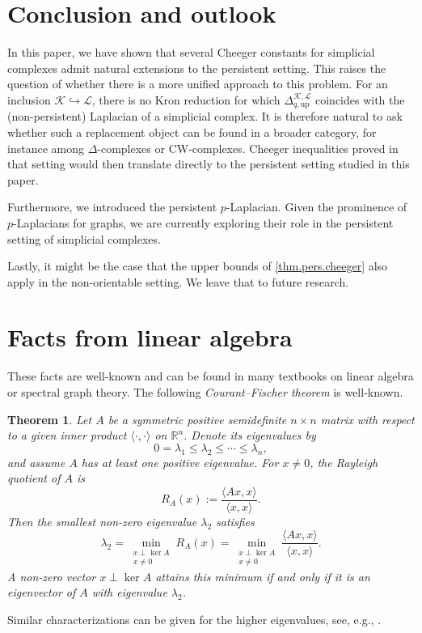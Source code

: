 \documentclass{article}
\newtheorem{theorem}{Theorem}[section]
\newcommand{\KK}{\mathcal{K}}
\newcommand{\LL}{\mathcal{L}}
\begin{document}
\section{Conclusion and outlook}
In this paper, we have shown that several Cheeger constants for
simplicial complexes admit natural extensions to the persistent setting.
This raises the question of whether there is a more unified approach to
this problem. For an inclusion \(\KK\hookrightarrow \LL\), there is no
Kron reduction for which \(\Delta_{q,\mathrm{up}}^{\KK,\LL}\) coincides
with the (non-persistent) Laplacian of a simplicial complex. It is therefore
natural to ask whether such a replacement object can be found in a
broader category, for instance among \(\Delta\)-complexes or
CW-complexes. Cheeger inequalities proved in that setting would then
translate directly to the persistent setting studied in this paper.

Furthermore, we introduced the persistent \(p\)-Laplacian. Given the
prominence of \(p\)-Laplacians for graphs, we are currently exploring
their role in the persistent setting of simplicial complexes.

Lastly, it might be the case that the upper bounds of \cref{thm.pers.cheeger} also apply in the non-orientable setting. We leave that to future research.


\appendix
\section{Facts from linear algebra}\label{sec.adjprop}
These facts are well-known and can be found in many textbooks on linear algebra or spectral graph theory. 
The following \emph{Courant--Fischer theorem} is well-known. 
\begin{theorem}
\label{thm.rayleigh}
Let $A$ be a symmetric positive semidefinite $n\times n$ matrix with respect to
a given inner product $\langle \cdot,\cdot\rangle$ on $\mathbb{R}^n$.  Denote
its eigenvalues by
\[
0 = \lambda_1 \le \lambda_2 \le \cdots \le \lambda_n,
\]
and assume $A$ has at least one positive eigenvalue.  
For $x \neq 0$, the Rayleigh quotient of $A$ is
\[
R_A(x) := \frac{\langle Ax, x\rangle}{\langle x, x\rangle}.
\]
Then the smallest non-zero eigenvalue $\lambda_2$ satisfies
\[
\lambda_2
= \min_{\substack{x \perp \ker A \\ x \neq 0}} R_A(x)
= \min_{\substack{x \perp \ker A \\ x \neq 0}}
   \frac{\langle Ax, x\rangle}{\langle x, x\rangle}.
\]
A non-zero vector $x\perp \ker A$ attains this minimum if and only if it is an
eigenvector of $A$ with eigenvalue $\lambda_2$.
\end{theorem}
Similar characterizations can be given for the higher eigenvalues, see, e.g., \cite{MR3077874}.
\end{document}
